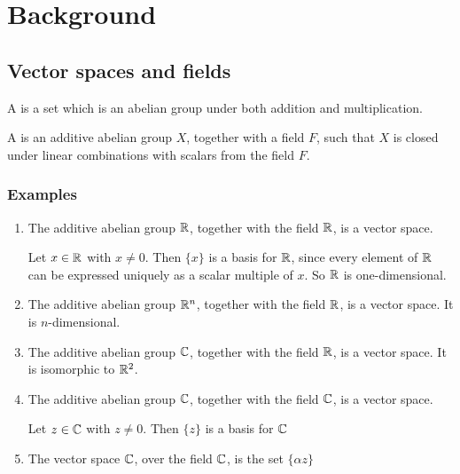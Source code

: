 \section{Background}

\subsection{Vector spaces and fields}
A  is a set which is an abelian group under both addition and multiplication.

A  is an additive abelian group $X$, together with a field $F$, such that $X$ is
closed under linear combinations with scalars from the field $F$.

\subsubsection{Examples}

\begin{enumerate}
\item The additive abelian group $\mathbb{R}$, together with the field $\mathbb{R}$, is a vector space.

  Let $x \in \mathbb{R}$ with $x \neq 0$. Then $\{x\}$ is a basis for $\mathbb{R}$, since every element of $\mathbb{R}$ can
  be expressed uniquely as a scalar multiple of $x$. So $\mathbb{R}$ is one-dimensional.

\item The additive abelian group $\mathbb{R}^n$, together with the field $\mathbb{R}$, is a vector space. It is $n$-dimensional.

\item The additive abelian group $\mathbb{C}$, together with the field $\mathbb{R}$, is a vector space. It is isomorphic to $\mathbb{R}^2$.

\item The additive abelian group $\mathbb{C}$, together with the field $\mathbb{C}$, is a vector space.

  Let $z \in \mathbb{C}$ with $z \neq 0$. Then $\{z\}$ is a basis for $\mathbb{C}$

\item The vector space $\mathbb{C}$, over the field $\mathbb{C}$, is the set $\{\alpha z\}$

\end{enumerate}
